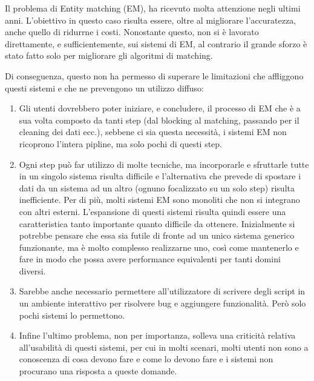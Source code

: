 Il problema di Entity matching (EM), ha ricevuto molta attenzione negli ultimi anni. 
L'obiettivo in questo caso risulta essere, oltre al migliorare l'accuratezza, anche quello di ridurrne i costi. Nonostante questo, non si è lavorato direttamente, e sufficientemente, sui sistemi di EM, al contrario il grande sforzo è stato fatto solo per migliorare gli algoritmi di matching. 

Di conseguenza, questo non ha permesso di superare le limitazioni che affliggono questi sistemi e che ne prevengono un utilizzo diffuso: 

\begin{enumerate}
    \item Gli utenti dovrebbero poter iniziare, e concludere, il processo di EM che è a sua volta composto da tanti step (dal blocking al matching, passando per il cleaning dei dati ecc.), sebbene ci sia questa necessità, i sistemi EM non ricoprono l'intera pipline, ma solo pochi di questi step.
    \item Ogni step può far utilizzo di molte tecniche, ma incorporarle e sfruttarle tutte in un singolo sistema risulta difficile e l'alternativa che prevede di spostare i dati da un sistema ad un altro (ognuno focalizzato su un solo step) risulta inefficiente. Per di più, molti sistemi EM sono monoliti che non si integrano con altri esterni. L'espansione di questi sistemi risulta quindi essere una caratteristica tanto importante quanto difficile da ottenere. Inizialmente si potrebbe pensare che essa sia futile di fronte ad un unico sistema  generico funzionante, ma è molto complesso realizzarne uno, così come mantenerlo e fare in modo che possa avere performance equivalenti per tanti domini diversi.
    \item Sarebbe anche necessario permettere all'utilizzatore di scrivere degli script in un ambiente interattivo per risolvere bug e aggiungere funzionalità. Però solo pochi sistemi lo permettono.
    \item Infine l'ultimo problema, non per importanza, solleva una criticità relativa all'usabilità di questi sistemi, per cui in molti scenari, molti utenti non sono a conoscenza di cosa devono fare e come lo devono fare e i sistemi non procurano una risposta a queste domande.
\end{enumerate}